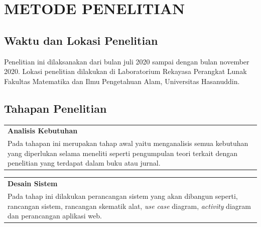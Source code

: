 \chapter{METODE PENELITIAN}

\setlength{\intextsep}{0cm}

\section{Waktu dan Lokasi Penelitian}
Penelitian ini dilaksanakan dari bulan juli 2020 sampai dengan bulan november 2020. Lokasi penelitian dilakukan di Laboratorium Rekayasa Perangkat Lunak Fakultas Matematika dan Ilmu Pengetahuan Alam, Universitas Hasanuddin.

\section{Tahapan Penelitian}

\begin{table} [H]
    \begin{tabular}{|>{\centering\arraybackslash}m{1\linewidth} |}
        \hline
        \textbf{Analisis Kebutuhan}\\ 
        Pada tahapan ini merupakan tahap awal yaitu menganalisis semua kebutuhan yang diperlukan selama meneliti seperti pengumpulan teori terkait dengan penelitian yang terdapat dalam buku atau jurnal.\\
        \hline
    \end{tabular}
\end{table}

\begin{center}
    \bigg\downarrow
\end{center}

\begin{table} [H]
    \begin{tabular}{|>{\centering\arraybackslash}m{1\linewidth} |}
        \hline
        \textbf{Desain Sistem}\\ 
        Pada tahap ini dilakukan perancangan sistem yang akan dibangun seperti, rancangan sistem, rancangan skematik alat, \textit{use case} diagram, \textit{activity} diagram dan perancangan aplikasi web.\\
        \hline
    \end{tabular}
\end{table}

\begin{center}
    \bigg\downarrow
\end{center}

